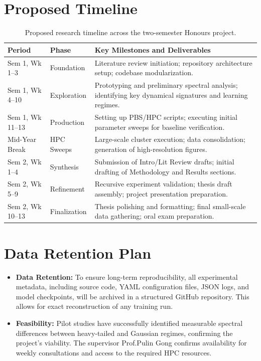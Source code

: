 \documentclass[11pt,a4paper]{article}
\begin{document}
\section{Proposed Timeline}
\begin{table}[h!]
\centering
\small
\begin{tabularx}{\textwidth}{@{} l l X @{}}
\toprule
\textbf{Period} & \textbf{Phase} & \textbf{Key Milestones and Deliverables} \\ \midrule
Sem 1, Wk 1--3 & Foundation & Literature review initiation; repository architecture setup; codebase modularization. \\ \addlinespace
Sem 1, Wk 4--10 & Exploration & Prototyping and preliminary spectral analysis; identifying key dynamical signatures and learning regimes. \\ \addlinespace
Sem 1, Wk 11--13 & Production & Setting up PBS/HPC scripts; executing initial parameter sweeps for baseline verification. \\ \addlinespace
Mid-Year Break & HPC Sweeps & Large-scale cluster execution; data consolidation; generation of high-resolution figures. \\ \addlinespace
Sem 2, Wk 1--4 & Synthesis & Submission of Intro/Lit Review drafts; initial drafting of Methodology and Results sections. \\ \addlinespace
Sem 2, Wk 5--9 & Refinement & Recursive experiment validation; thesis draft assembly; project presentation preparation. \\ \addlinespace
Sem 2, Wk 10--13 & Finalization & Thesis polishing and formatting; final small-scale data gathering; oral exam preparation. \\ \bottomrule
\end{tabularx}
\caption{Proposed research timeline across the two-semester Honours project.}
\end{table}
\section{Data Retention Plan}
\begin{itemize}
\item \textbf{Data Retention:} To ensure long-term reproducibility, all experimental metadata, including source code, YAML configuration files, JSON logs, and model checkpoints, will be archived in a structured GitHub repository. This allows for exact reconstruction of any training run.
\item \textbf{Feasibility:} Pilot studies have successfully identified measurable spectral differences between heavy-tailed and Gaussian regimes, confirming the project's viability. The supervisor Prof.\;Pulin Gong confirms availability for weekly consultations and access to the required HPC resources.
\end{itemize}
\end{document}
